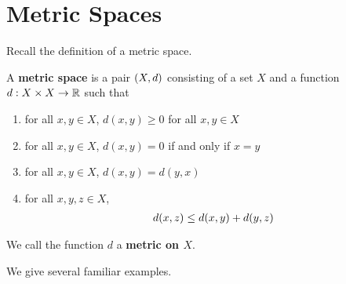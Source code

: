 \section{Metric Spaces}

Recall the definition of a metric space.

\begin{boxdefinition}
    A \textbf{metric space} is a pair $\left( X, d \right)$ consisting of a set $X$ and a function $d : X \times X \to \mathbb{R}$ such that
    \begin{enumerate}
        \item for all $x, y \in X$, $d(x, y) \geq 0$ for all $x, y \in X$
        \item for all $x, y \in X$, $d(x, y) = 0$ if and only if $x = y$
        \item for all $x, y \in X$, $d(x, y) = d(y, x)$
        \item for all $x, y, z \in X$,
        \begin{align*}
            d\!\left( x, z \right) \leq d\!\left( x, y \right) + d\!\left( y, z \right)
        \end{align*}
    \end{enumerate}
    We call the function $d$ a \textbf{metric on $X$}.
\end{boxdefinition}

We give several familiar examples.

